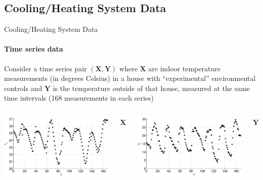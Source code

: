 \documentclass{beamer}
\begin{document}
\subsection{Cooling/Heating System Data}
\begin{frame}{Cooling/Heating System Data}
\framesubtitle{Time series data}
Consider a time series pair $(\mathbf{X},\mathbf{Y})$ where $\mathbf{X}$ are indoor temperature measurements (in degrees Celsius) in a house with ``experimental'' environmental controls and $\mathbf{Y}$ is the temperature outside of that house, measured at the same time intervals (168 measurements in each series)\footnotemark
{}
\begin{columns}[c]
	\includegraphics[scale=0.33]{CoolingSystemExample_X.eps}\\
    \begin{center}$\mathbf{X}$\end{center}
	\includegraphics[scale=0.33]{CoolingSystemExample_Y.eps}\\
    \begin{center}$\mathbf{Y}$\end{center}
\end{columns}
\pause
\begin{center}\end{center}
\end{frame}
\end{document}
